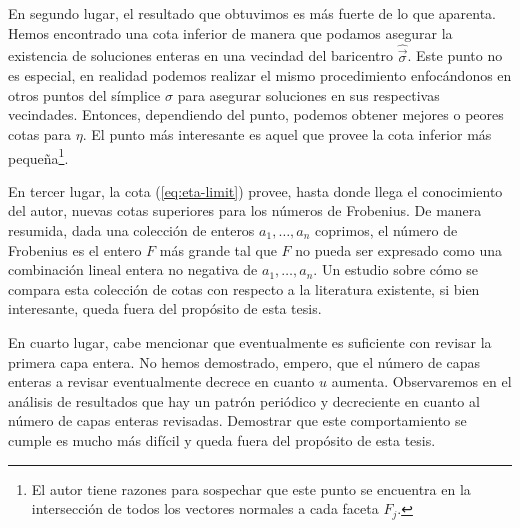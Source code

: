 En segundo lugar, el resultado que obtuvimos es más fuerte de lo que aparenta. Hemos encontrado una
cota inferior de manera que podamos asegurar la existencia de soluciones enteras en una vecindad del
baricentro $\hat{\vec{\sigma}}$. Este punto no es especial, en realidad podemos realizar el mismo
procedimiento enfocándonos en otros puntos del símplice $\sigma$ para asegurar soluciones en sus
respectivas vecindades. Entonces, dependiendo del punto, podemos obtener mejores o peores cotas para
$\eta$. El punto más interesante es aquel que provee la cota inferior más pequeña\footnote{
	El autor tiene razones para sospechar que este punto se encuentra en la intersección de todos
	los vectores normales a cada faceta $F_j$.
}.

En tercer lugar, la cota (\ref{eq:eta-limit}) provee, hasta donde llega el conocimiento del autor,
nuevas cotas superiores para los números de Frobenius. De manera resumida, dada una colección de
enteros $a_1, \ldots, a_n$ coprimos, el número de Frobenius es el entero $F$ más grande tal que $F$
no pueda ser expresado como una combinación lineal entera no negativa de $a_1, \ldots, a_n$. Un
estudio sobre cómo se compara esta colección de cotas con respecto a la literatura existente, si
bien interesante, queda fuera del propósito de esta tesis.

En cuarto lugar, cabe mencionar que eventualmente es suficiente con revisar la primera capa entera.
No hemos demostrado, empero, que el número de capas enteras a revisar eventualmente decrece en
cuanto $u$ aumenta. Observaremos en el análisis de resultados que hay un patrón periódico y
decreciente en cuanto al número de capas enteras revisadas. Demostrar que este comportamiento se
cumple es mucho más difícil y queda fuera del propósito de esta tesis.

